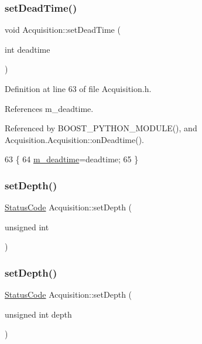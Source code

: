 \subsubsection{\texorpdfstring{set\+Dead\+Time()}{setDeadTime()}\hspace{0.1cm}{\footnotesize\ttfamily [2/2]}}
{\footnotesize\ttfamily void Acquisition\+::set\+Dead\+Time (\begin{DoxyParamCaption}\item[{int}]{deadtime }\end{DoxyParamCaption})\hspace{0.3cm}{\ttfamily [inline]}}



Definition at line 63 of file Acquisition.\+h.



References m\+\_\+deadtime.



Referenced by B\+O\+O\+S\+T\+\_\+\+P\+Y\+T\+H\+O\+N\+\_\+\+M\+O\+D\+U\+L\+E(), and Acquisition.\+Acquisition\+::on\+Deadtime().


\begin{DoxyCode}
63                                 \{
64     \hyperlink{classAcquisition_a5f7fe20506e7d860ed61935255adfe17}{m\_deadtime}=deadtime;
65   \}
\end{DoxyCode}
\mbox{\label{classAcquisition_a303145d497f99da966fcfd95c00cd81e}} 
\subsubsection{\texorpdfstring{set\+Depth()}{setDepth()}\hspace{0.1cm}{\footnotesize\ttfamily [1/2]}}
{\footnotesize\ttfamily \hyperlink{classStatusCode}{Status\+Code} Acquisition\+::set\+Depth (\begin{DoxyParamCaption}\item[{unsigned}]{int }\end{DoxyParamCaption})}

\mbox{\label{classAcquisition_a303145d497f99da966fcfd95c00cd81e}} 
\subsubsection{\texorpdfstring{set\+Depth()}{setDepth()}\hspace{0.1cm}{\footnotesize\ttfamily [2/2]}}
{\footnotesize\ttfamily \hyperlink{classStatusCode}{Status\+Code} Acquisition\+::set\+Depth (\begin{DoxyParamCaption}\item[{unsigned int}]{depth }\end{DoxyParamCaption})}



